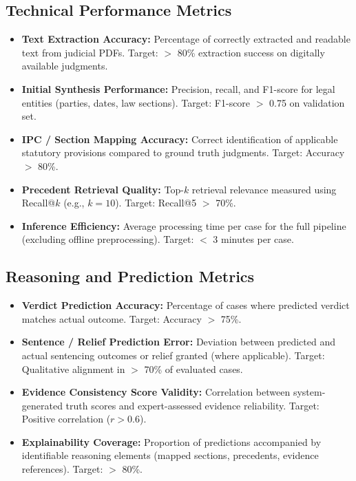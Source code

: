 \subsection{Technical Performance Metrics}
\begin{itemize}
	\item \textbf{Text Extraction Accuracy:} Percentage of correctly extracted and readable text from judicial PDFs. Target: $>$ 80\% extraction success on digitally available judgments.
	\item \textbf{Initial Synthesis Performance:} Precision, recall, and F1-score for legal entities (parties, dates, law sections). Target: F1-score $>$ 0.75 on validation set.
	\item \textbf{IPC / Section Mapping Accuracy:} Correct identification of applicable statutory provisions compared to ground truth judgments. Target: Accuracy $>$ 80\%.
	\item \textbf{Precedent Retrieval Quality:} Top-$k$ retrieval relevance measured using Recall@$k$ (e.g., $k=10$). Target: Recall@5 $>$ 70\%.
	\item \textbf{Inference Efficiency:} Average processing time per case for the full pipeline (excluding offline preprocessing). Target: $<$ 3 minutes per case.
\end{itemize}

\subsection{Reasoning and Prediction Metrics}
\begin{itemize}
	\item \textbf{Verdict Prediction Accuracy:} Percentage of cases where predicted verdict matches actual outcome. Target: Accuracy $>$ 75\%.
	\item \textbf{Sentence / Relief Prediction Error:} Deviation between predicted and actual sentencing outcomes or relief granted (where applicable). Target: Qualitative alignment in $>$ 70\% of evaluated cases.
	\item \textbf{Evidence Consistency Score Validity:} Correlation between system-generated truth scores and expert-assessed evidence reliability. Target: Positive correlation ($r > 0.6$).
	\item \textbf{Explainability Coverage:} Proportion of predictions accompanied by identifiable reasoning elements (mapped sections, precedents, evidence references). Target: $>$ 80\%.
\end{itemize}

